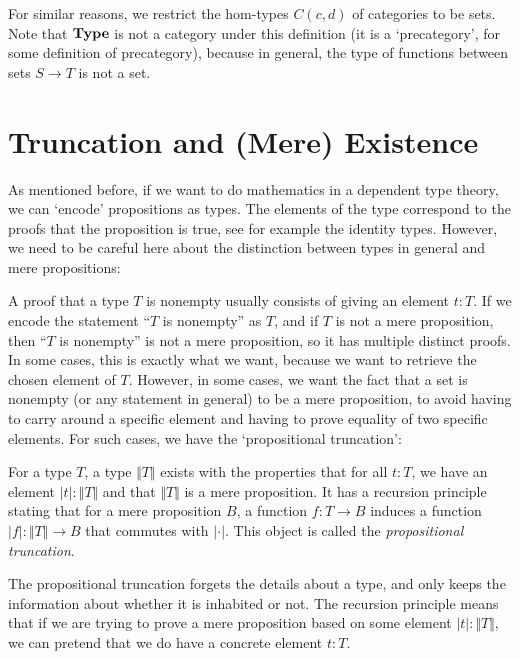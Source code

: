 For similar reasons, we restrict the hom-types $ C(c, d) $ of categories to be sets. Note that $ \mathbf{Type} $ is not a category under this definition (it is a `precategory', for some definition of precategory), because in general, the type of functions between sets $ S \to T $ is not a set.

\section{Truncation and (Mere) Existence}\label{sec:truncation-mere-existence}
As mentioned before, if we want to do mathematics in a dependent type theory, we can `encode' propositions as types. The elements of the type correspond to the proofs that the proposition is true, see for example the identity types. However, we need to be careful here about the distinction between types in general and mere propositions:

A proof that a type $ T $ is nonempty usually consists of giving an element $ t : T $. If we encode the statement ``$ T $ is nonempty'' as $ T $, and if $ T $ is not a mere proposition, then ``$ T $ is nonempty'' is not a mere proposition, so it has multiple distinct proofs. In some cases, this is exactly what we want, because we want to retrieve the chosen element of $ T $. However, in some cases, we want the fact that a set is nonempty (or any statement in general) to be a mere proposition, to avoid having to carry around a specific element and having to prove equality of two specific elements. For such cases, we have the `propositional truncation':

\begin{definition}
  For a type $ T $, a type $ \Vert T \Vert $ exists \autocite[][Section 3.7]{hottbook} with the properties that for all $ t: T $, we have an element $ \vert t \vert : \Vert T \Vert $ and that $ \Vert T \Vert $ is a mere proposition. It has a recursion principle stating that for a mere proposition $ B $, a function $ f: T \to B $ induces a function $ \vert f \vert: \Vert T \Vert \to B $ that commutes with $ \vert \cdot \vert $. This object is called the \textit{propositional truncation}.
\end{definition}
The propositional truncation forgets the details about a type, and only keeps the information about whether it is inhabited or not. The recursion principle means that if we are trying to prove a mere proposition based on some element $ \vert t \vert: \Vert T \Vert $, we can pretend that we do have a concrete element $ t: T $.

